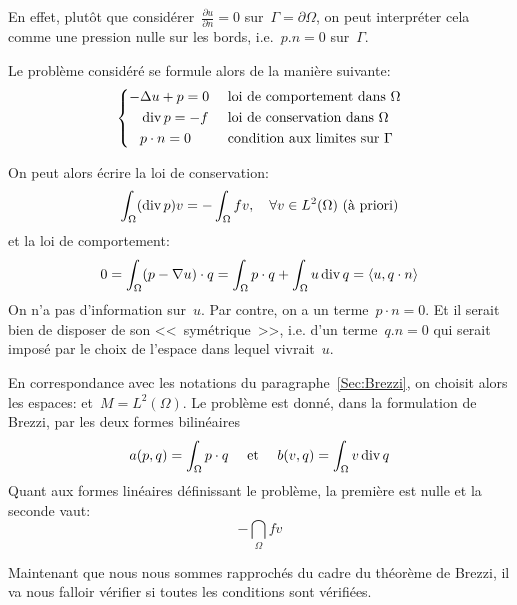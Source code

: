 En effet, plutôt que considérer~$\frac{\partial u}{\partial n}=0$ sur~$\Gamma=\partial\Omega$,
on peut interpréter cela comme une pression nulle sur les bords, i.e.~$p.n=0$ sur~$\Gamma$.

\medskip
Le problème considéré se formule alors de la manière suivante:
\begin{equation}\left\{
\begin{aligned}
-&\Delta u +p =0 && \text{ loi de comportement dans } \Omega\\
&\operatorname{div} p = -f && \text{ loi de conservation dans } \Omega\\
& p\cdot n=0 && \text{ condition aux limites sur }\Gamma
\end{aligned}
\right.
\end{equation}

On peut alors écrire la loi de conservation:
\begin{equation}
\displaystyle\int_\Omega (\operatorname{div} p) v = -\displaystyle\int_\Omega fv,\quad \forall v\in L^2(\Omega) \text{ (à priori)}
\end{equation}
et la loi de comportement:
\begin{equation}
0=\displaystyle\int_\Omega (p-\nabla u)\cdot q = \displaystyle\int_\Omega p\cdot q + \displaystyle\int_\Omega u \operatorname{div} q=\langle u,q\cdot n\rangle
\end{equation}
On n'a pas d'information sur~$u$.
Par contre, on a un terme~$p\cdot n=0$.
Et il serait bien de disposer de son <<~symétrique~>>, i.e. d'un terme~$q.n=0$ qui serait imposé
par le choix de l'espace dans lequel vivrait~$u$.

\medskip
En correspondance avec les notations du paragraphe~\ref{Sec:Brezzi}, on choisit alors les espaces:
et~$M=L^2(\Omega)$.
Le problème est donné, dans la formulation de Brezzi,
par les deux formes bilinéaires
\begin{equation}a(p,q)=\displaystyle\int_\Omega p\cdot q\quad\text{ et }\quad b(v,q)=\displaystyle\int_\Omega v\operatorname{div} q\end{equation}
Quant aux formes linéaires définissant le problème, la première est nulle et la
seconde vaut:\begin{equation}-\dint_\Omega fv\end{equation}

\medskip
Maintenant que nous nous sommes rapprochés du cadre du théorème de Brezzi,
il va nous falloir vérifier si toutes les conditions sont vérifiées.

